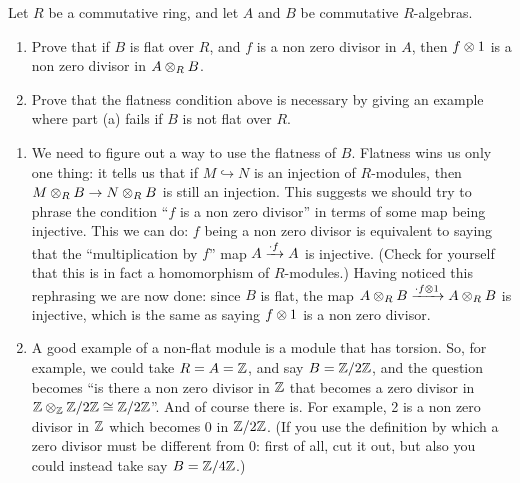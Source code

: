 \begin{question}[subtitle = {January 2024 Problem 4, notation altered},ID=Jan24_4]
Let $R$ be a commutative ring, and let $A$ and $B$ be commutative $R$-algebras.
\begin{enumerate}
    \item Prove that if $B$ is flat over $R$, and $f$ is a non zero divisor in $A$, then $f \otimes 1$ is a non zero divisor in $A \otimes_R B$.
    \item Prove that the flatness condition above is necessary by giving an example where part (a) fails if $B$ is not flat over $R$.
\end{enumerate}
\end{question}
\begin{solution}
\begin{enumerate}
    \item We need to figure out a way to use the flatness of $B$. Flatness wins us only one thing: it tells us that if $M \hookrightarrow N$ is an injection of $R$-modules, then $M \otimes_R B \to N \otimes_R B$ is still an injection. This suggests we should try to phrase the condition ``$f$ is a non zero divisor'' in terms of some map being injective. This we can do: $f$ being a non zero divisor is equivalent to saying that the ``multiplication by $f$'' map $A \xrightarrow{\cdot f} A$ is injective. (Check for yourself that this is in fact a homomorphism of $R$-modules.) Having noticed this rephrasing we are now done: since $B$ is flat, the map $A \otimes_R B \xrightarrow{\cdot f \otimes 1} A \otimes_R B$ is injective, which is the same as saying $f \otimes 1$ is a non zero divisor.
    \item A good example of a non-flat module is a module that has torsion. So, for example, we could take $R = A = \mathbb{Z}$, and say $B = \mathbb{Z}/2\mathbb{Z}$, and the question becomes ``is there a non zero divisor in $\mathbb{Z}$ that becomes a zero divisor in $\mathbb{Z} \otimes_{\mathbb{Z}} \mathbb{Z}/2\mathbb{Z} \cong \mathbb{Z}/2\mathbb{Z}$''. And of course there is. For example, 2 is a non zero divisor in $\mathbb{Z}$ which becomes 0 in $\mathbb{Z}/2\mathbb{Z}$. (If you use the definition by which a zero divisor must be different from 0: first of all, cut it out, but also you could instead take say $B = \mathbb{Z}/4\mathbb{Z}$.)
\end{enumerate}
\end{solution}

